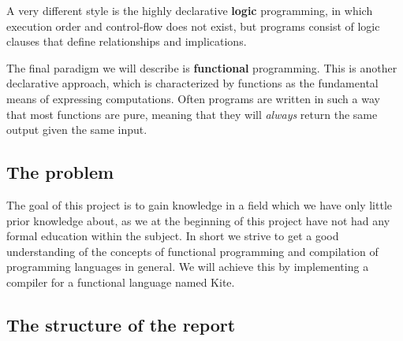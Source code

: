 A very different style is the highly declarative \textbf{logic} programming, in which execution order and control-flow does not exist, but programs consist of logic clauses that define relationships and implications.

The final paradigm we will describe is \textbf{functional} programming. This is another declarative approach, which is characterized by functions as the fundamental means of expressing computations. Often programs are written in such a way that most functions are pure, meaning that they will \emph{always} return the same output given the same input.

\subsection{The problem}
The goal of this project is to gain knowledge in a field which we have only little prior knowledge about, as we at the beginning of this project have not had any formal education within the subject. In short we strive to get a good understanding of the concepts of functional programming and compilation of programming languages in general. We will achieve this by implementing a compiler for a functional language named Kite.

\subsection{The structure of the report}

